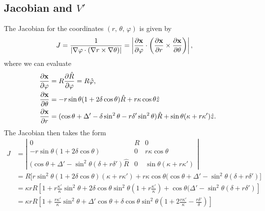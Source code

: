 \documentclass[11pt,a4paper]{article}
\renewcommand{\b}[1]{\ensuremath{ {\bf #1 } }}
\begin{document}
\subsection{Jacobian and $V'$}

The Jacobian for the coordinates $(r,\,\theta,\,\varphi)$ is given by
\begin{align}
J &= \frac{1}{|\nabla \varphi \cdot( \nabla r \times \nabla \theta)|} = \left| \frac{\partial \b{x}}{\partial \varphi}\cdot \left(\frac{\partial \b{x}}{\partial r}\times\frac{\partial \b{x}}{\partial \theta}\right)\right|,
\end{align}
where we can evaluate
\begin{align}
\frac{\partial \b{x}}{\partial \varphi} &= R\frac{\partial \hat{R}}{\partial \varphi} = R\hat{\varphi}, \nonumber \\
\frac{\partial \b{x}}{\partial \theta} &= -r\sin\theta(1+2\delta \cos\theta) \hat{R} + r\kappa\cos\theta \hat{z} \nonumber \\
\frac{\partial \b{x}}{\partial r} &=(\cos\theta + \Delta' -\delta\sin^2\theta - r\delta'\sin^2\theta)\hat{R} + \sin\theta(\kappa + r\kappa')\hat{z}.
\end{align}
The Jacobian then takes the form
\begin{align}
J &= \left| \begin{matrix}
0 & R & 0 \\
-r\sin\theta(1+2\delta\cos\theta) & 0 & r\kappa\cos\theta \\
(\cos\theta + \Delta' - \sin^2\theta(\delta+ r\delta')\hat{R}  & 0 & \sin\theta(\kappa + r\kappa')
\end{matrix}\right| \nonumber \\
&= R\Big[ r\sin^2\theta(1+2\delta\cos\theta)(\kappa+r\kappa') + r\kappa\cos\theta(\cos\theta + \Delta' - \sin^2\theta(\delta+r\delta')\Big] \nonumber \\
&= \kappa rR \left[ 1+r \frac{\kappa'}{\kappa}\sin^2 \theta  + 2\delta \cos\theta\sin^2\theta \left(1+r\frac{\kappa'}{\kappa}\right)  + \cos\theta(\Delta'-\sin^2\theta(\delta + r\delta') \right] \nonumber \\
&=  \kappa rR \left[ 1+\frac{r\kappa'}{\kappa}\sin^2 \theta + \Delta'\cos\theta + \delta\cos\theta\sin^2\theta \left(1+2\frac{r\kappa'}{\kappa} - \frac{r\delta'}{\delta}\right)\right]%
\end{align}
\end{document}
